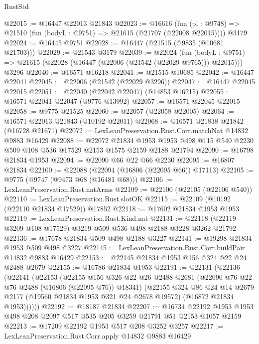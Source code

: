 \begin{lexlean}{RustStd}
\begin{coremodule}
@22015 := @16447 @22013 @21843
@22023 := @16616
    (fun (pl : @9748) => @21510 (fun (bodyL : @9751) => @21615 (@21707 (@22008 @22015))))
    @3179
@22024 := @16445 @9751
@22028 := @16447 (@21515 (@9835 (@10681 @21703)))
@22029 := @21543 @3179
@22039 := @22024
    (fun (bodyL : @9751) => @21615 (@22028 (@16447 (@22006 (@21542 (@22029 @9765))) @22015)))
    @3296
@22040 := @16571 @16218
@22041 := @21515 @10685
@22042 := @16447 @22041
@22045 := @22006 (@21542 (@22029 @3296))
@22047 := @16447 @22045 @22015
@22051 := @22040 (@22042 @22047) (@14853 @16215)
@22055 := @16571 @22041 @22047 (@9776 @13992)
@22057 := @16571 @22045 @22015
@22058 := @9775 @21525
@22060 := @22057 (@22058 @22005)
@22064 := @16571 @22013 @21843 (@10192 @22011)
@22068 := @16571 @21838 @21842 (@16728 @21671)
@22072 := LexLeanPreservation.Rust.Corr.matchNat @14832 @9883 @16429
@22088 := @22072
    @21834
    @1953
    @1953
    @498
    @115
    @540
    @2230
    @509
    @108
    @536
    @17529
    @2153
    @1575
    @2159
    @2188
    @21794
@22090 := @16798 @21834 @1953
@22094 := @22090 @66 @22 @66 @2230
@22095 := @16807 @21834
@22100 := @22088 (@22094 (@16806 (@22095 @66)) @17113)
@22105 := @9775 (@9747 (@9473 @68 (@16481 @68)))
@22106 := LexLeanPreservation.Rust.natArms
@22109 := @22100 (@22105 (@22106 @540))
@22110 := LexLeanPreservation.Rust.slotOK
@22115 := @22109 (@10192 (@22110 @21834 @17529)) @17852
@22118 := @17602 @21834 @1953 @1953
@22119 := LexLeanPreservation.Rust.Kind.nat
@22131 := @22118 (@22119 @3209 @108 @17529) @3219 @509 @536 @498 @2188 @3228 @3262 @21792
@22136 := @17678 @21834 @509 @498 @2188 @3227
@22141 := @19298 @21834 @1953 @509 @498 @3227
@22145 := LexLeanPreservation.Rust.Corr.buildPair @14832 @9883 @16429
@22153 := @22145 @21834 @1953 @156 @324 @22 @24 @2488 @2679
@22155 := @16786 @21834 @1953
@22191 := @22131
    (@22136
      (@22141
        (@22153
          (@22155
            @156
            @326
            @22
            @26
            @2488
            @2681
            (@22090 @76 @22 @76 @2488 (@16806 (@22095 @76)) @18341)
            (@22155
              @324
              @86
              @24
              @14
              @2679
              @2177
              (@19560 @21834 @1953 @321 @24 @2678 @19572)
              (@16872 @21834 @1953))))))
@22192 := @18187 @21834
@22207 := @16734
    @22192
    @1953
    @1953
    @498
    @208
    @2097
    @517
    @535
    @205
    @3259
    @21791
    @51
    @2153
    @1057
    @2159
@22213 := @17209 @22192 @1953 @517 @208 @3252 @3257
@22217 := LexLeanPreservation.Rust.Corr.apply @14832 @9883 @16429

\end{coremodule}
\end{lexlean}
